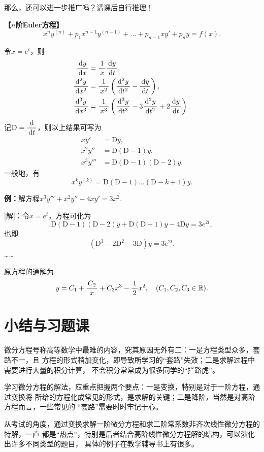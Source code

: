 那么，还可以进一步推广吗？请课后自行推理！

\begin{shaded}
	{\bf 【$n$阶Euler方程】}
	$$x^ny^{(n)}+p_1x^{n-1}y^{(n-1)}+\ldots+p_{n-1}xy'
	+p_ny=f(x).$$
	
	令$x=e^t$，则
	\begin{align*}
		\displaystyle\frac{\,{\mathrm{d} y}\,}{\,{\mathrm{d} x}\,}&=\displaystyle\frac{\,{1}\,}{\,{x}\,}\displaystyle\frac{\,{\mathrm{d} y}\,}{\,{\mathrm{d} t}\,},\\
		\displaystyle\frac{\,{\mathrm{d}^2 y}\,}{\,{\mathrm{d} x^2}\,}&=\displaystyle\frac{\,{1}\,}{\,{x^2}\,}\left(\displaystyle\frac{\,{\mathrm{d}^2 y}\,}{\,{\mathrm{d} t^2}\,}
		-\displaystyle\frac{\,{\mathrm{d} y}\,}{\,{\mathrm{d} t}\,}\right),\\
		\displaystyle\frac{\,{\mathrm{d}^3 y}\,}{\,{\mathrm{d} x^3}\,}&=\displaystyle\frac{\,{1}\,}{\,{x^3}\,}\left(\displaystyle\frac{\,{\mathrm{d}^3 y}\,}{\,{\mathrm{d} t^3}\,}
		-3\displaystyle\frac{\,{\mathrm{d}^2 y}\,}{\,{\mathrm{d} t^2}\,}+2\displaystyle\frac{\,{\mathrm{d} y}\,}{\,{\mathrm{d} t}\,}\right).
	\end{align*}
	记$\mathrm{D}=\displaystyle\frac{\,{\mathrm{d}}\,}{\,{\mathrm{d} t}\,}$，则以上结果可写为
	\begin{align*}
		xy'&=\mathrm{D}y,\\
		x^2y''&=\mathrm{D}(\mathrm{D}-1)y,\\
		x^3y'''&=\mathrm{D}(\mathrm{D}-1)(\mathrm{D}-2)y.
	\end{align*}
	一般地，有
	$$x^ky^{(k)}=\mathrm{D}(\mathrm{D}-1)\ldots(\mathrm{D}-k+1)y.$$
	
	{\bf 例：}解方程$x^3y'''+x^2y''-4xy'=3x^2$.
	
	[解]：令$x=e^t$，方程可化为
	$$\mathrm{D}(\mathrm{D}-1)(\mathrm{D}-2)y+\mathrm{D}(\mathrm{D}-1)y
	-4\mathrm{D}y=3e^{2t},$$
	也即
	$$(\mathrm{D}^3-2\mathrm{D}^2-3\mathrm{D})y=3e^{2t}.$$
	\ldots\ldots
	
	原方程的通解为
	$$y=C_1+\displaystyle\frac{\,{C_2}\,}{\,{x}\,}+C_3x^3-\displaystyle\frac{\,{1}\,}{\,{2}\,}x^2,\quad(C_1,C_2,C_3\in\mathbb{R}).$$
\end{shaded}

\section{小结与习题课}

微分方程号称高等数学中最难的内容，究其原因无外有二：一是方程类型众多，套路不一，且
方程的形式稍加变化，即导致所学习的“套路”失效；二是求解过程中需要进行大量的积分计算，
不会积分常常成为很多同学的“拦路虎”。

学习微分方程的解法，应重点把握两个要点：一是变换，特别是对于一阶方程，通过变换将
所给的方程化成常见的形式，是求解的关键；二是降阶，当然是对高阶方程而言，一些常见的
“套路”需要时时牢记于心。

从考试的角度，通过变换求解一阶微分方程和求二阶常系数非齐次线性微分方程的特解，一直
都是“热点”，特别是后者结合高阶线性微分方程解的结构，可以演化出许多不同类型的题目，
具体的例子在教学辅导书上有很多。

